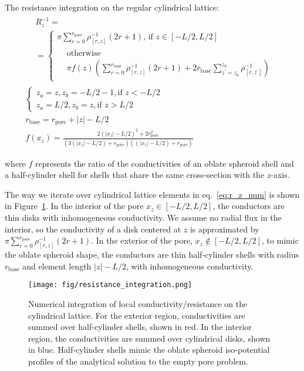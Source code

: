 \documentclass[10pt, a4paper]{article}
\begin{document}
\begin{multicols}{2}
The resistance integration on the regular cylindrical lattice:
\begin{gather}
    \label{eq:r_z_num}
    \begin{aligned} 
        &R_z^{-1} =
        \\
        &=\begin{cases}
             \pi \sum_{r=0}^{r_{\textrm{pore}}} \rho^{-1}_{[r,z]} (2r+1) \textrm{, if } z\in[-L/2,L/2]
             \\[4pt]
             \begin{aligned}
                &\textrm{otherwise}
                \\
                &\pi f(z) \left(\sum_{r=0}^{r_{\textrm{base}}} \rho^{-1}_{[r,z]} (2r+1) + 2 r_{\textrm{base}} \sum_{z^{\prime} = z_{a}}^{z_{b}}\rho^{-1}_{[r,z^{\prime}]}\right)
             \end{aligned}
        \end{cases}
    \end{aligned}
    \\
    \begin{cases}
        z_{a} = z, z_{b} = -L/2-1, \textrm{if } z < -L/2
        \\
        z_{a} = L/2, z_{b} = z, \textrm{if } z > L/2
    \end{cases}
    \\
    \label{eq:r_base}
    r_{\textrm{base}} = r_{\textrm{pore}} + |z| - L/2
    \\
    \label{eq:prefactor}
    f(x_z) = \frac{2(|x_z|-L/2)^2 + 2r_{\textrm{pore}}^2}{(3(|x_z|-L/2)+r_{\textrm{pore}})((|x_z|-L/2)+r_{\textrm{pore}})}
\end{gather}

where $f$ represents the ratio of the conductivities of an oblate spheroid shell and a half-cylinder shell for shells that share the same cross-section with the $z$-axis.

The way we iterate over cylindrical lattice elements in eq.~\ref{eq:r_z_num} is shown in Figure~\ref{fig:integration_scheme}.
In the interior of the pore $x_z \in [-L/2, L/2]$, the conductors are thin disks with inhomogeneous conductivity.
We assume no radial flux in the interior, so the conductivity of a disk centered at $z$ is approximated by $\pi \sum_{r=0}^{r_{\textrm{pore}}} \rho^{-1}_{[r,z]} (2r + 1)$.
In the exterior of the pore, $x_z \notin [-L/2, L/2]$, to mimic the oblate spheroid shape, the conductors are thin half-cylinder shells with radius $r_{\textrm{base}}$ and element length $|z| - L/2$, with inhomogeneous conductivity.
\begin{figure}[H]
    \centering
    \texttt{[image: fig/resistance\_integration.png]}
    \caption{
        Numerical integration of local conductivity/resistance on the cylindrical lattice.
        For the exterior region, conductivities are summed over half-cylinder shells, shown in red.
        In the interior region, the conductivities are summed over cylindrical disks, shown in blue.
        Half-cylinder shells mimic the oblate spheroid iso-potential profiles of the analytical solution to the empty pore problem.
        }
    \label{fig:integration_scheme}
\end{figure}


\end{multicols}
\end{document}
